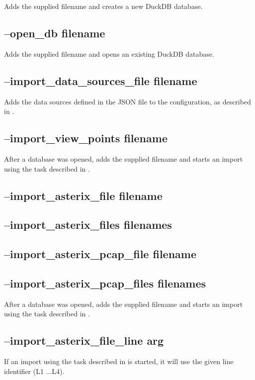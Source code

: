 Adds the supplied filename and creates a new DuckDB database.
 
\subsection{--open\_db filename}

Adds the supplied filename and opens an existing DuckDB database.

\subsection{--import\_data\_sources\_file filename}

Adds the data sources defined in the JSON file to the configuration, as described in .

\subsection{--import\_view\_points filename}

After a database was opened, adds the supplied filename and starts an import using the task described in .
 
\subsection{--import\_asterix\_file filename}
\subsection{--import\_asterix\_files filenames}
\subsection{--import\_asterix\_pcap\_file filename}
\subsection{--import\_asterix\_pcap\_files filenames}

After a database was opened, adds the supplied filename and starts an import using the task described in .

\subsection{--import\_asterix\_file\_line arg}

If an import using the task described in  is started, it will use the given line identifier (L1 ...L4).


